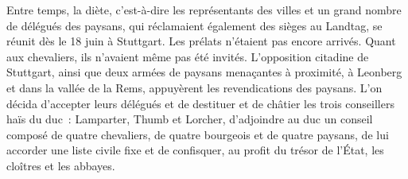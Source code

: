 \documentclass[french,twoside]{book} %
\begin{document}
Entre temps, la diète, c’est-à-dire les représentants des villes et un grand nombre de délégués des paysans, qui réclamaient également des sièges au Landtag, se réunit dès le 18 juin à Stuttgart. Les prélats n’étaient pas encore arrivés. Quant aux chevaliers, ils n’avaient même pas été invités. L’opposition citadine de Stuttgart, ainsi que deux armées de paysans menaçantes à proximité, à Leonberg et dans la vallée de la Rems, appuyèrent les revendications des paysans. L’on décida d’accepter leurs délégués et de destituer et de châtier les trois conseillers haïs du duc : Lamparter, Thumb et Lorcher, d’adjoindre au duc un conseil composé de quatre chevaliers, de quatre bourgeois et de quatre paysans, de lui accorder une liste civile fixe et de confisquer, au profit du trésor de l’État, les cloîtres et les abbayes.\par
\end{document}
